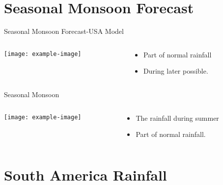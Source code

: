 \documentclass[handout,t]{beamer}
\begin{document}
\section{Seasonal Monsoon Forecast}
\begin{frame}{Seasonal Monsoon Forecast-USA Model}
    \begin{columns}[onlytextwidth,T]
        \begin{column}{.54\textwidth}
            \texttt{[image: example-image]}
        \end{column}
        \begin{column}{.47\textwidth}
            \begin{itemize}
                \item Part of normal rainfall
                \item During later possible.
            \end{itemize}
        \end{column}
    \end{columns}
\end{frame}
\begin{frame}{Seasonal Monsoon}
\begin{columns}[onlytextwidth,T]
    \begin{column}{.6\textwidth}
        \texttt{[image: example-image]}
    \end{column}
    \begin{column}{.43\textwidth}
        \begin{itemize}
            \item The rainfall during summer 
            \item Part of  normal rainfall.
        \end{itemize}
    \end{column}
\end{columns}
\end{frame}



\section{South America Rainfall}
\end{document}
